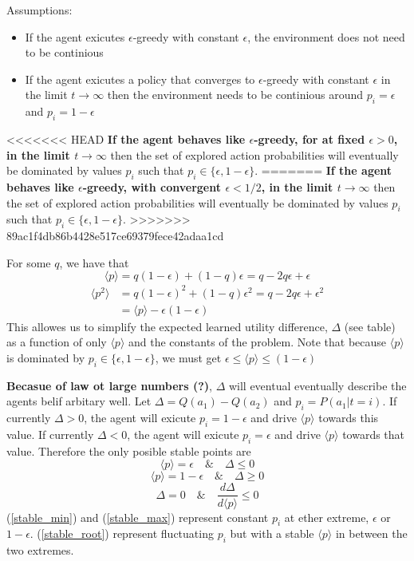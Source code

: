\documentclass[a4paper]{article}
\newcommand{\ep}{\langle p \rangle}
\newcommand{\pp}{\langle p^2 \rangle}
\begin{document}
Assumptions:
\begin{itemize}
	\item If the agent exicutes $\epsilon$-greedy with constant $\epsilon$, the environment does not need to be continious
	\item If the agent exicutes a policy that converges to $\epsilon$-greedy with constant $\epsilon$ in the limit $t\rightarrow\infty$ then the environment needs to be continious around $p_i=\epsilon$ and $p_i=1-\epsilon$
\end{itemize}


<<<<<<< HEAD
\textbf{If the agent behaves like $\epsilon$-greedy, for at fixed $\epsilon>0$, in the limit $t\rightarrow\infty$} then the set of explored action probabilities will eventually be dominated by values $p_i$ such that $p_i\in\{\epsilon,1-\epsilon\}$.
=======
\textbf{If the agent behaves like $\epsilon$-greedy, with convergent $\epsilon<1/2$, in the limit $t\rightarrow\infty$} then the set of explored action probabilities will eventually be dominated by values $p_i$ such that $p_i\in\{\epsilon,1-\epsilon\}$.
>>>>>>> 89ac1f4db86b4428e517ce69379fece42adaa1cd

For some $q$, we have that
\begin{equation}
	\ep = q(1-\epsilon) + (1-q)\epsilon = q - 2q\epsilon + \epsilon
\end{equation}
\begin{align}
	\pp &= q(1-\epsilon)^2 + (1-q)\epsilon^2 = q - 2q\epsilon + \epsilon^2\\
	    &= \ep - \epsilon(1-\epsilon)
\end{align}
This allowes us to simplify the expected learned utility difference, $\Delta$ (see table) as a function of only $\ep$ and the constants of the problem. Note that because $\ep$ is dominated by $p_i\in\{\epsilon,1-\epsilon\}$, we must get $\epsilon\leq\ep\leq(1-\epsilon)$

\textbf{Becasue of law ot large numbers (?)}, $\Delta$ will eventual eventually describe the agents belif arbitary well. Let $\Delta=Q(a_1)-Q(a_2)$ and $p_i = P(a_1|t=i)$. If currently $\Delta>0$, the agent will exicute $p_i=1-\epsilon$ and drive $\ep$ towards this value. If currently $\Delta<0$, the agent will exicute $p_i=\epsilon$ and drive $\ep$ towards that value. Therefore the only posible stable points are
\begin{equation}\label{stable_min}
	\ep = \epsilon \quad \& \quad \Delta\leq0
\end{equation}
\begin{equation}\label{stable_max}
	\ep = 1-\epsilon \quad \& \quad \Delta\geq0
\end{equation}
\begin{equation}\label{stable_root}
	\Delta=0 \quad \& \quad \frac{d\Delta}{d\ep}\leq0
\end{equation}
(\ref{stable_min}) and (\ref{stable_max}) represent constant $p_i$ at ether extreme, $\epsilon$ or $1-\epsilon$. (\ref{stable_root}) represent fluctuating $p_i$ but with a stable $\ep$ in between the two extremes.
\end{document}
